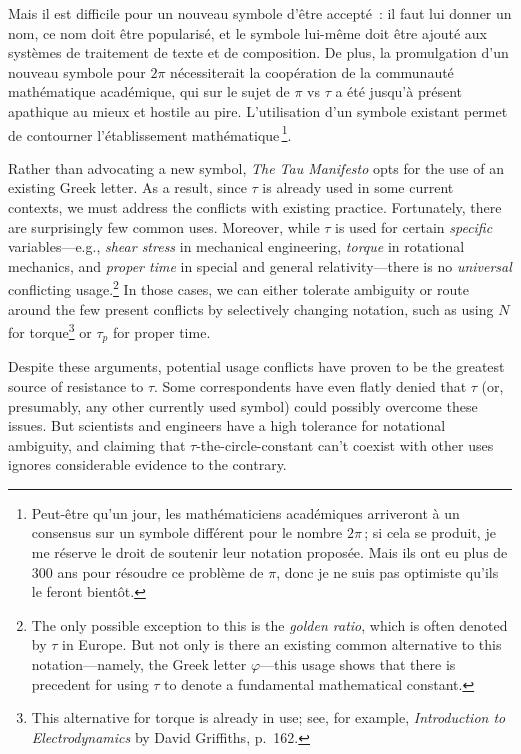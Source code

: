 Mais il est difficile pour un nouveau symbole d'être accepté~: il faut lui donner un nom, ce nom doit être popularisé, et le symbole lui-même doit être ajouté aux systèmes de traitement de texte et de composition. De plus, la promulgation d'un nouveau symbole pour $2\pi$ nécessiterait la coopération de la communauté mathématique académique, qui sur le sujet de $\pi$ vs $\tau$ a été jusqu'à présent apathique au mieux et hostile au pire. L'utilisation d'un symbole existant permet de contourner l'établissement mathématique\,\footnote{Peut-être qu'un jour, les mathématiciens académiques arriveront à un consensus sur un symbole différent pour le nombre $2\pi$\,; si cela se produit, je me réserve le droit de soutenir leur notation proposée. Mais ils ont eu plus de 300 ans pour résoudre ce problème de $\pi$, donc je ne suis pas optimiste qu'ils le feront bientôt.}.

Rather than advocating a new symbol, \emph{The Tau Manifesto} opts for the use of an existing Greek letter. As a result, since $\tau$ is already used in some current contexts, we must address the conflicts with existing practice. Fortunately, there are surprisingly few common uses. Moreover, while $\tau$ is used for certain \emph{specific} variables---e.g., \emph{shear stress} in mechanical engineering, \emph{torque} in rotational mechanics, and \emph{proper time} in special and general relativity---there is no \emph{universal} conflicting usage.\footnote{The only possible exception to this is the \emph{golden ratio}, which is often denoted by $\tau$ in Europe. But not only is there an existing common alternative to this notation---namely, the Greek letter $\varphi$---this usage shows that there is precedent for using $\tau$ to denote a fundamental mathematical constant.} In those cases, we can either tolerate ambiguity or route around the few present conflicts by selectively changing notation, such as using $N$ for torque\footnote{This alternative for torque is already in use; see, for example, \emph{Introduction to Electrodynamics} by David Griffiths, p.~162.} or $\tau_p$ for proper time.

Despite these arguments, potential usage conflicts have proven to be the greatest source of resistance to $\tau$. Some correspondents have even flatly denied that $\tau$ (or, presumably, any other currently used symbol) could possibly overcome these issues. But scientists and engineers have a high tolerance for notational ambiguity, and claiming that $\tau$-the-circle-constant can't coexist with other uses ignores considerable evidence to the contrary.

